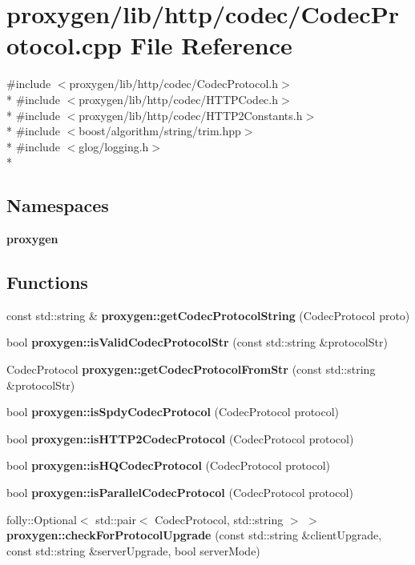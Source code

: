\section{proxygen/lib/http/codec/\+Codec\+Protocol.cpp File Reference}
\label{CodecProtocol_8cpp}
{\ttfamily \#include $<$proxygen/lib/http/codec/\+Codec\+Protocol.\+h$>$}\\*
{\ttfamily \#include $<$proxygen/lib/http/codec/\+H\+T\+T\+P\+Codec.\+h$>$}\\*
{\ttfamily \#include $<$proxygen/lib/http/codec/\+H\+T\+T\+P2\+Constants.\+h$>$}\\*
{\ttfamily \#include $<$boost/algorithm/string/trim.\+hpp$>$}\\*
{\ttfamily \#include $<$glog/logging.\+h$>$}\\*
\subsection*{Namespaces}
\begin{DoxyCompactItemize}
\item 
 {\bf proxygen}
\end{DoxyCompactItemize}
\subsection*{Functions}
\begin{DoxyCompactItemize}
\item 
const std\+::string \& {\bf proxygen\+::get\+Codec\+Protocol\+String} (Codec\+Protocol proto)
\item 
bool {\bf proxygen\+::is\+Valid\+Codec\+Protocol\+Str} (const std\+::string \&protocol\+Str)
\item 
Codec\+Protocol {\bf proxygen\+::get\+Codec\+Protocol\+From\+Str} (const std\+::string \&protocol\+Str)
\item 
bool {\bf proxygen\+::is\+Spdy\+Codec\+Protocol} (Codec\+Protocol protocol)
\item 
bool {\bf proxygen\+::is\+H\+T\+T\+P2\+Codec\+Protocol} (Codec\+Protocol protocol)
\item 
bool {\bf proxygen\+::is\+H\+Q\+Codec\+Protocol} (Codec\+Protocol protocol)
\item 
bool {\bf proxygen\+::is\+Parallel\+Codec\+Protocol} (Codec\+Protocol protocol)
\item 
folly\+::\+Optional$<$ std\+::pair$<$ Codec\+Protocol, std\+::string $>$ $>$ {\bf proxygen\+::check\+For\+Protocol\+Upgrade} (const std\+::string \&client\+Upgrade, const std\+::string \&server\+Upgrade, bool server\+Mode)
\end{DoxyCompactItemize}
